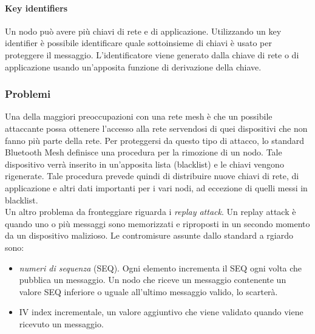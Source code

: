 \paragraph{Key identifiers}
Un nodo può avere più chiavi di rete e di applicazione. Utilizzando un key identifier è possibile identificare quale sottoinsieme di chiavi è usato per proteggere il messaggio. L'identificatore viene generato dalla chiave di rete o di applicazione usando un'apposita funzione di derivazione della chiave.

\subsubsection{Problemi}
Una della maggiori preoccupazioni con una rete mesh è che un possibile attaccante possa ottenere l'accesso alla rete servendosi di quei dispositivi che non fanno più parte della rete. Per proteggersi da questo tipo di attacco, lo standard Bluetooth Mesh definisce una procedura per la rimozione di un nodo. Tale dispositivo verrà inserito in un'apposita lista (blacklist) e le chiavi vengono rigenerate. Tale procedura prevede quindi di distribuire nuove chiavi di rete, di applicazione e altri dati importanti per i vari nodi, ad eccezione di quelli messi in blacklist.\\
Un altro problema da fronteggiare riguarda i \textit{replay attack}. Un replay attack è quando uno o più messaggi sono memorizzati e riproposti in un secondo momento da un dispositivo malizioso. Le contromisure assunte dallo standard a rgiardo sono:
\begin{itemize}
    \item \textit{numeri di sequenza} (SEQ). Ogni elemento incrementa il SEQ ogni volta che pubblica un messaggio. Un nodo che riceve un messaggio contenente un valore SEQ inferiore o uguale all'ultimo messaggio valido, lo scarterà.
    \item IV index incrementale, un valore aggiuntivo che viene validato quando viene ricevuto un messaggio.
\end{itemize}

